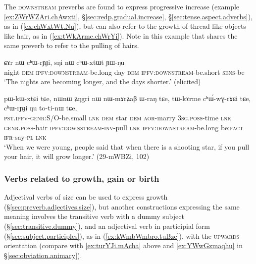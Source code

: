 The \textsc{downstream} preverbs are found to express progressive increase (example \ref{ex:ZWrWZAri.chAwxti}, §\ref{sec:redp.gradual.increase}, §\ref{sec:tense.aspect.adverbs}), as in (\ref{ex:chWxtWt.Nu}), but can also refer to the growth of thread-like objects like hair, as in (\ref{ex:tWkArme.chWrYi}). Note in this example that  shares the same preverb to refer to the pulling of hairs.
 
\begin{exe}
\ex \label{ex:chWxtWt.Nu}
\gll ɕɤr nɯ cʰɯ-rɲɟi, sŋi nɯ cʰɯ-xtɯt ɲɯ-ŋu \\
night \textsc{dem} \textsc{ipfv}:\textsc{downstream}-be.long day \textsc{dem}  \textsc{ipfv}:\textsc{downstream}-be.short \textsc{sens}-be \\
\glt `The nights are becoming longer, and the days shorter.' (elicited)
\end{exe}

\begin{exe}
\ex \label{ex:tWkArme.chWrYi}
\gll pɯ-kɯ-xtɕi tɕe, nɯnɯ ʑŋgri nɯ nɯ-mɤrʑaβ ɯ-raŋ tɕe, tɯ-kɤrme cʰɯ́-wɣ-rɤɕi tɕe, cʰɯ-rɲɟi ŋu to-ti-nɯ tɕe,\\
\textsc{pst}.\textsc{ipfv}-\textsc{genr}:S/O-be.small \textsc{lnk} \textsc{dem} star \textsc{dem}  \textsc{aor}-marry \textsc{3sg}.\textsc{poss}-time \textsc{lnk} \textsc{genr}.\textsc{poss}-hair \textsc{ipfv}:\textsc{downstream}-\textsc{inv}-pull \textsc{lnk} \textsc{ipfv}:\textsc{downstream}-be.long be:\textsc{fact} \textsc{ifr}-say-\textsc{pl} \textsc{lnk} \\
\glt `When we were young, people said that when there is a shooting star, if you pull your hair, it will grow longer.' (29-mWBZi, 102)
 \end{exe}

\subsubsection{Verbs related to growth, gain or birth} \label{sec:preverb.gain}
Adjectival verbs of size can be used to express growth (§\ref{sec:preverb.adjectives.size}), but another constructions expressing the same meaning involves the transitive verb  with a dummy subject (§\ref{sec:transitive.dummy}), and an adjectival verb in participial form (§\ref{sec:subject.participles}), as in (\ref{ex:kWmbWmbro.tuBze}), with the \textsc{upwards} orientation (compare with \ref{ex:turYJi.mAcha} above and \ref{ex:YWwGzmaqhu} in §\ref{sec:obviation.animacy}).
 

